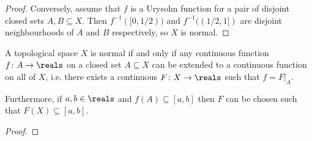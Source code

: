 \documentclass[article, a4paper, 11pt, oneside]{memoir}
\numberwithin{equation}{chapter}
\newcommand{\preim}{^{-1}}
\begin{document}
\begin{proof}
    Conversely, assume that $f$ is a Urysohn function for a pair of disjoint closed sets $A,B \subseteq X$. Then $f\preim([0,1/2))$ and $f\preim((1/2,1])$ are disjoint neighbourhoods of $A$ and $B$ respectively, so $X$ is normal.
\end{proof}


\begin{theorem}
    A topological space $X$ is normal if and only if any continuous function $f \colon A \to \reals$ on a closed set $A \subseteq X$ can be extended to a continuous function on all of $X$, i.e. there exists a continuous $F \colon X \to \reals$ such that $f = F|_A$.

    Furthermore, if $a,b \in \reals$ and $f(A) \subseteq [a,b]$ then $F$ can be chosen such that $F(X) \subseteq [a,b]$.
\end{theorem}

\begin{proof}
    
\end{proof}


\nocite{*}

\printbibliography
\end{document}
